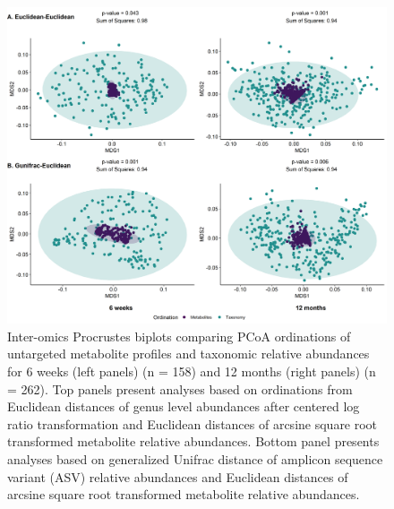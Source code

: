 \begin{figure}[!h]
    \centering
    \includegraphics[width=0.95\linewidth]{figures/appB_fs1.png}
    \caption[Inter-omics Procrustes biplots comparing PCoA ordinations of untargeted metabolite profiles and taxonomic relative abundances for 6 weeks (left panels) (n = 158) and 12 months (right panels) (n = 262).]{Inter-omics Procrustes biplots comparing PCoA ordinations of untargeted metabolite profiles and taxonomic relative abundances for 6 weeks (left panels) (n = 158) and 12 months (right panels) (n = 262). Top panels present analyses based on ordinations from Euclidean distances of genus level abundances after centered log ratio transformation and Euclidean distances of arcsine square root transformed metabolite relative abundances. Bottom panel presents analyses based on generalized Unifrac distance of amplicon sequence variant (ASV) relative abundances and Euclidean distances of arcsine square root transformed metabolite relative abundances.}
    \label{fig:b1}
\end{figure}

